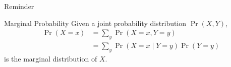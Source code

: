 \documentclass{beamer}
\begin{document}
\begin{frame}{Reminder}
    \pause
    \begin{block}{Marginal Probability}
        Given a joint probability distribution $ \Pr \left( X, Y \right) $,
        \begin{align*}
            \Pr \left( X = x \right) &= \sum_{y} \Pr \left( X = x, Y = y \right) \\
                                     &= \sum_{y} \Pr \left( X = x \mid Y = y \right) \Pr \left( Y = y \right)
        \end{align*}
        is the \alert{marginal distribution} of $ X $.
    \end{block}
\end{frame}

\end{document}

